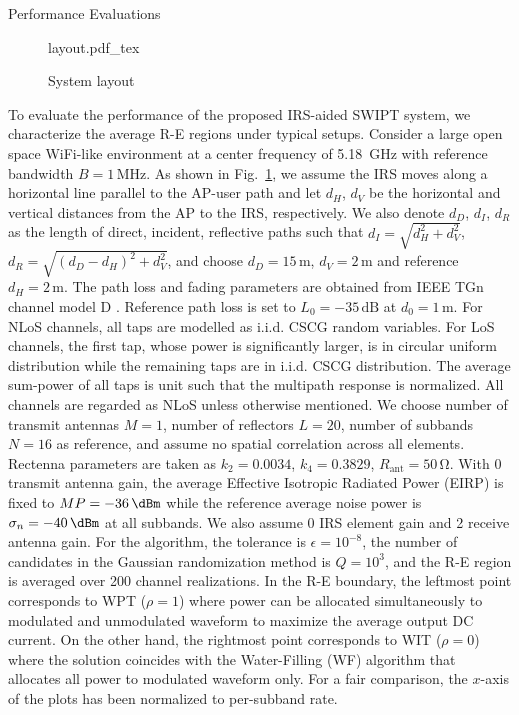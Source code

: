 \documentclass[journal]{IEEEtran}
\begin{document}
	\begin{section}{Performance Evaluations}\label{se:performance_evaluation}
		\begin{figure}[!t]
			\centering
			\def\svgwidth{\columnwidth}
			{layout.pdf_tex}
			\caption{System layout}
			\label{fi:layout}
		\end{figure}
		To evaluate the performance of the proposed IRS-aided SWIPT system, we characterize the average R-E regions under typical setups. Consider a large open space WiFi-like environment at a center frequency of \SI{5.18}{\GHz} with reference bandwidth $B=1\,\si{\MHz}$. As shown in Fig.~\ref{fi:layout}, we assume the IRS moves along a horizontal line parallel to the AP-user path and let $d_H$, $d_V$ be the horizontal and vertical distances from the AP to the IRS, respectively. We also denote $d_D$, $d_I$, $d_R$ as the length of direct, incident, reflective paths such that $d_I=\sqrt{d_H^2+d_V^2}$, $d_R=\sqrt{(d_D-d_H)^2+d_V^2}$, and choose $d_D=15\,\si{\meter}$, $d_V=2\,\si{\meter}$ and reference $d_H=2\,\si{\meter}$. The path loss and fading parameters are obtained from IEEE TGn channel model D \cite{Erceg2004}. Reference path loss is set to $L_0=-35\,\si{\dB}$ at $d_0=1\,\si{\meter}$. For NLoS channels, all taps are modelled as i.i.d. CSCG random variables. For LoS channels, the first tap, whose power is significantly larger, is in circular uniform distribution while the remaining taps are in i.i.d. CSCG distribution. The average sum-power of all taps is unit such that the multipath response is normalized. All channels are regarded as NLoS unless otherwise mentioned. We choose number of transmit antennas $M=1$, number of reflectors $L=20$, number of subbands $N=16$ as reference, and assume no spatial correlation across all elements. Rectenna parameters are taken as $k_2=0.0034$, $k_4=0.3829$, $R_{\text{ant}}=50\,\si{\ohm}$. With \SI{0}{\dBi} transmit antenna gain, the average Effective Isotropic Radiated Power (EIRP) is fixed to $MP=-36\,\si{\dBm}$ while the reference average noise power is $\sigma_n=-40\,\si{\dBm}$ at all subbands. We also assume \SI{0}{\dBi} IRS element gain and \SI{2}{\dBi} receive antenna gain. For the algorithm, the tolerance is $\epsilon=10^{-8}$, the number of candidates in the Gaussian randomization method is $Q=10^{3}$, and the R-E region is averaged over \num{200} channel realizations. In the R-E boundary, the leftmost point corresponds to WPT ($\rho=1$) where power can be allocated simultaneously to modulated and unmodulated waveform to maximize the average output DC current. On the other hand, the rightmost point corresponds to WIT ($\rho=0$) where the solution coincides with the Water-Filling (WF) algorithm that allocates all power to modulated waveform only. For a fair comparison, the $x$-axis of the plots has been normalized to per-subband rate.


\end{section}
\end{document}
